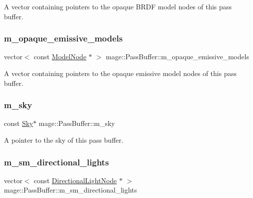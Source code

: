 A vector containing pointers to the opaque B\+R\+DF model nodes of this pass buffer. \hypertarget{structmage_1_1_pass_buffer_a6a2c8f757aca5b28eda0bec25f412e05}{}\label{structmage_1_1_pass_buffer_a6a2c8f757aca5b28eda0bec25f412e05} 
\subsubsection{\texorpdfstring{m\+\_\+opaque\+\_\+emissive\+\_\+models}{m\_opaque\_emissive\_models}}
{\footnotesize\ttfamily vector$<$ const \hyperlink{classmage_1_1_model_node}{Model\+Node} $\ast$ $>$ mage\+::\+Pass\+Buffer\+::m\+\_\+opaque\+\_\+emissive\+\_\+models\hspace{0.3cm}{\ttfamily [private]}}

A vector containing pointers to the opaque emissive model nodes of this pass buffer. \hypertarget{structmage_1_1_pass_buffer_a19d0163dbfe7e60c664fdf433d47146b}{}\label{structmage_1_1_pass_buffer_a19d0163dbfe7e60c664fdf433d47146b} 
\subsubsection{\texorpdfstring{m\+\_\+sky}{m\_sky}}
{\footnotesize\ttfamily const \hyperlink{structmage_1_1_sky}{Sky}$\ast$ mage\+::\+Pass\+Buffer\+::m\+\_\+sky\hspace{0.3cm}{\ttfamily [private]}}

A pointer to the sky of this pass buffer. \hypertarget{structmage_1_1_pass_buffer_aa1161b50d505260607bda900f6856e0b}{}\label{structmage_1_1_pass_buffer_aa1161b50d505260607bda900f6856e0b} 
\subsubsection{\texorpdfstring{m\+\_\+sm\+\_\+directional\+\_\+lights}{m\_sm\_directional\_lights}}
{\footnotesize\ttfamily vector$<$ const \hyperlink{namespacemage_a7637b5351fc0f66a10badd80ebb35899}{Directional\+Light\+Node} $\ast$ $>$ mage\+::\+Pass\+Buffer\+::m\+\_\+sm\+\_\+directional\+\_\+lights\hspace{0.3cm}{\ttfamily [private]}}

